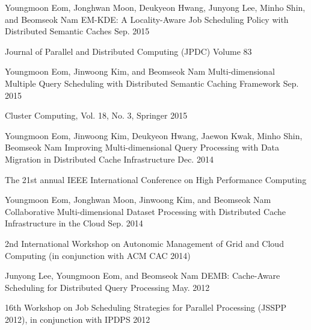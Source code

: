 \begin{cventries}
\cventry
{Youngmoon Eom, Jonghwan Moon, Deukyeon Hwang, Junyong Lee, Minho Shin, and Beomseok Nam} %
{EM-KDE: A Locality-Aware Job Scheduling Policy with Distributed Semantic Caches} %
{} %
{Sep. 2015} %
{ %
\begin{cvitems}
\item {Journal of Parallel and Distributed Computing (JPDC) Volume 83}
\end{cvitems}
}


\cventry
{Youngmoon Eom, Jinwoong Kim, and Beomseok Nam} %
{Multi-dimensional Multiple Query Scheduling with Distributed Semantic Caching Framework} %
{} %
{Sep. 2015} %
{ %
\begin{cvitems}
\item {Cluster Computing, Vol. 18, No. 3, Springer 2015}
\end{cvitems}
}

\cventry
{Youngmoon Eom, Jinwoong Kim, Deukyeon Hwang, Jaewon Kwak, Minho Shin, Beomseok Nam} %
{Improving Multi-dimensional Query Processing with Data Migration in Distributed Cache Infrastructure} %
{} %
{Dec. 2014} %
{ %
\begin{cvitems}
\item {The 21st annual IEEE International Conference on High Performance Computing}
\end{cvitems}
}

\cventry
{Youngmoon Eom, Jonghwan Moon, Jinwoong Kim, and Beomseok Nam} %
{Collaborative Multi-dimensional Dataset Processing with Distributed Cache Infrastructure in the Cloud} %
{} %
{Sep. 2014} %
{ %
\begin{cvitems}
\item {2nd International Workshop on Autonomic Management of Grid and Cloud Computing (in conjunction with ACM CAC 2014)}
\end{cvitems}
}

\cventry
{Junyong Lee, Youngmoon Eom, and Beomseok Nam} %
{DEMB: Cache-Aware Scheduling for Distributed Query Processing} %
{} %
{May. 2012} %
{ %
\begin{cvitems}
\item {16th Workshop on Job Scheduling Strategies for Parallel Processing (JSSPP 2012), in conjunction with IPDPS 2012}
\end{cvitems}
}


\end{cventries}
